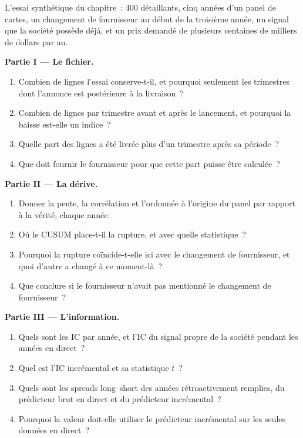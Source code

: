 \begin{problem}\label{pb:rs:alternative-and-text-data:1}
L'essai synthétique du chapitre~: 400 détaillants, cinq années d'un panel de cartes, un changement de fournisseur au début de la troisième année, un signal que la
société possède déjà, et un prix demandé de plusieurs centaines de milliers de dollars par an.

\medskip\noindent\textbf{Partie I --- Le fichier.}
\begin{enumerate}
\item Combien de lignes l'essai conserve-t-il, et pourquoi seulement les trimestres dont l'annonce est postérieure à la livraison~?
\item Combien de lignes par trimestre avant et après le lancement, et pourquoi la baisse est-elle un indice~?
\item Quelle part des lignes a été livrée plus d'un trimestre après sa période~?
\item Que doit fournir le fournisseur pour que cette part puisse être calculée~?
\end{enumerate}

\medskip\noindent\textbf{Partie II --- La dérive.}
\begin{enumerate}[resume]
\item Donner la pente, la corrélation et l'ordonnée à l'origine du panel par rapport à la vérité, chaque année.
\item Où le CUSUM place-t-il la rupture, et avec quelle statistique~?
\item Pourquoi la rupture coïncide-t-elle ici avec le changement de fournisseur, et quoi d'autre a changé à ce moment-là~?
\item Que conclure si le fournisseur n'avait pas mentionné le changement de fournisseur~?
\end{enumerate}

\medskip\noindent\textbf{Partie III --- L'information.}
\begin{enumerate}[resume]
\item Quels sont les IC par année, et l'IC du signal propre de la société pendant les années en direct~?
\item Quel est l'IC incrémental et sa statistique $t$~?
\item Quels sont les spreads long--short des années rétroactivement remplies, du prédicteur brut en direct et du prédicteur incrémental~?
\item Pourquoi la valeur doit-elle utiliser le prédicteur incrémental sur les seules données en direct~?
\end{enumerate}


\end{problem}
